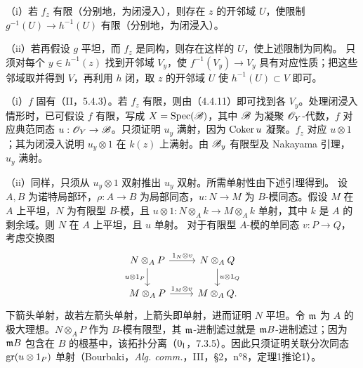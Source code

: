 （i）若 $f_z$ 有限（分别地，为闭浸入），则存在 $z$ 的开邻域 $U$，使限制 $g^{-1}(U)\to h^{-1}(U)$ 有限（分别地，为闭浸入）。

（ii）若再假设 $g$ 平坦，而 $f_z$ 是同构，则存在这样的 $U$，使上述限制为同构。
\eproof
只须对每个 $y\in h^{-1}(z)$ 找到开邻域 $V_y$，使 $f^{-1}(V_y)\to V_y$ 具有对应性质；把这些邻域取并得到 $V$，再利用 $h$ 闭，取 $z$ 的开邻域 $U$ 使 $h^{-1}(U)\subset V$ 即可。

（i）$f$ 固有（II，5.4.3）。若 $f_z$ 有限，则由（4.4.11）即可找到各 $V_y$。处理闭浸入情形时，已可假设 $f$ 有限，写成 $X=\operatorname{Spec}(\mathscr B)$，其中 $\mathscr B$ 为凝聚 $\mathscr O_Y$-代数，$f$ 对应典范同态 $u:\mathscr O_Y\to\mathscr B$。只须证明 $u_y$ 满射，因为 $\operatorname{Coker} u$ 凝聚。$f_z$ 对应 $u\otimes1$；其为闭浸入说明 $u_y\otimes1$ 在 $k(z)$ 上满射。由 $\mathscr B_y$ 有限型及 Nakayama 引理，$u_y$ 满射。

（ii）同样，只须从 $u_y\otimes1$ 双射推出 $u_y$ 双射。所需单射性由下述引理得到。\finishproof
{}
设 $A,B$ 为诺特局部环，$\rho:A\to B$ 为局部同态，$u:N\to M$ 为 $B$-模同态。假设 $M$ 在 $A$ 上平坦，$N$ 为有限型 $B$-模，且 $u\otimes1:N\otimes_Ak\to M\otimes_Ak$ 单射，其中 $k$ 是 $A$ 的剩余域。则 $N$ 在 $A$ 上平坦，且 $u$ 单射。
\eproof
对于有限型 $A$-模的单同态 $v:P\to Q$，考虑交换图
\[
\begin{tikzcd}
N\otimes_AP\arrow[r,"1_N\otimes v"]\arrow[d,"u\otimes1_P"']&N\otimes_AQ\arrow[d,"u\otimes1_Q"]\\
M\otimes_AP\arrow[r,"1_M\otimes v"]&M\otimes_AQ.
\end{tikzcd}
\]
下箭头单射，故若左箭头单射，上箭头即单射，进而证明 $N$ 平坦。令 $\mathfrak m$ 为 $A$ 的极大理想。$N\otimes_AP$ 作为 $B$-模有限型，其 $\mathfrak m$-进制滤过就是 $\mathfrak m B$-进制滤过；因为 $\mathfrak m B$ 包含在 $B$ 的根基中，该拓扑分离（$0_{\mathrm I}$，7.3.5）。因此只须证明关联分次同态 $\operatorname{gr}(u\otimes1_P)$ 单射（Bourbaki，\textit{Alg. comm.}，III，§2，n°8，定理1推论1）。

